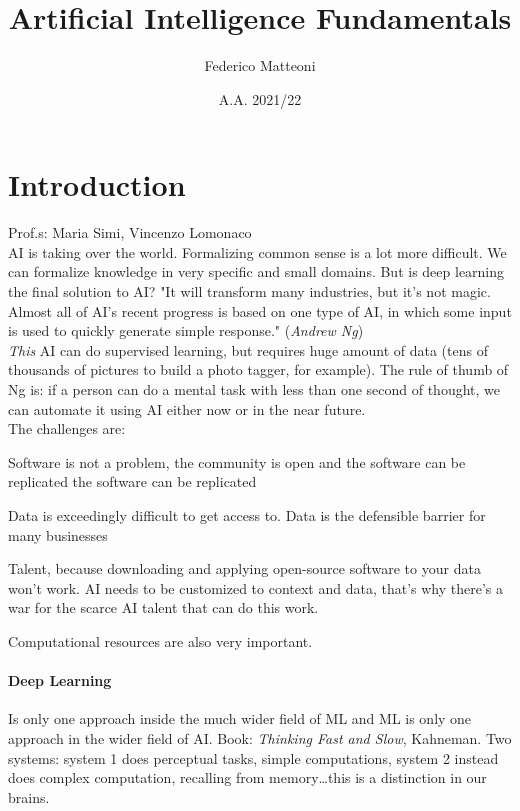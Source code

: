 \documentclass[10pt]{report}
\begin{document}
\title{Artificial Intelligence Fundamentals}
\author{Federico Matteoni}
\date{A.A. 2021/22}
\renewcommand*\contentsname{Index}

\maketitle
\begin{multicols}{2}
\tableofcontents
\end{multicols}
\pagebreak
\section{Introduction}
Prof.s: Maria Simi, Vincenzo Lomonaco\\
AI is taking over the world. Formalizing common sense is a lot more difficult. We can formalize knowledge in very specific and small domains. But is deep learning the final solution to AI? "It will transform many industries, but it's not magic. Almost all of AI's recent progress is based on one type of AI, in which some input is used to quickly generate simple response." (\textit{Andrew Ng})\\
\textit{This} AI can do supervised learning, but requires huge amount of data (tens of thousands of pictures to build a photo tagger, for example). The rule of thumb of Ng is: if a person can do a mental task with less than one second of thought, we can automate it using AI either now or in the near future.\\
The challenges are:
\begin{list}{}{}
	\item Software is not a problem, the community is open and the software can be replicated the software can be replicated
	\item Data is exceedingly difficult to get access to. Data is the defensible barrier for many businesses
	\item Talent, because downloading and applying open-source software to your data won't work. AI needs to be customized to context and data, that's why there's a war for the scarce AI talent that can do this work.
	\item Computational resources are also very important.
\end{list}
\paragraph{Deep Learning} Is only one approach inside the much wider field of ML and ML is only one approach in the wider field of AI. Book: \textit{Thinking Fast and Slow}, Kahneman. Two systems: system 1 does perceptual tasks, simple computations, system 2 instead does complex computation, recalling from memory\ldots this is a distinction in our brains.
\end{document}
